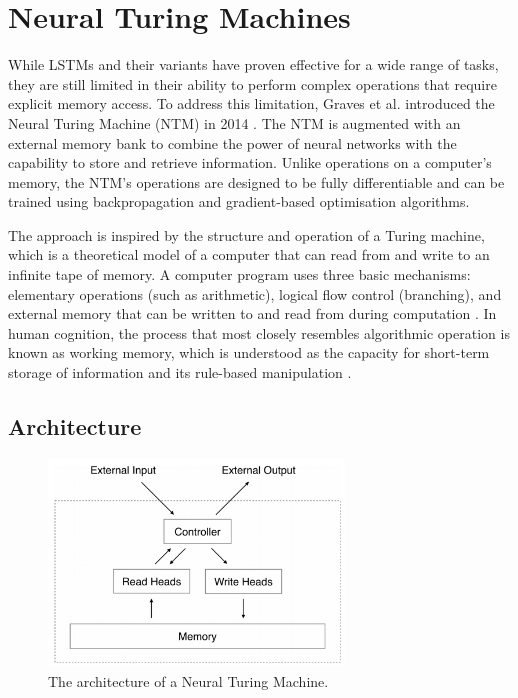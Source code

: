 \documentclass{article}
\begin{document}
\section{Neural Turing Machines}
\label{ch:4}

While LSTMs and their variants have proven effective for a wide range of tasks, they are
still limited in their ability to perform complex operations that require explicit memory
access. To address this limitation, Graves et al. introduced the Neural Turing Machine
(NTM) in 2014 \cite{gravesNeuralTuringMachines2014}. The NTM is augmented with an external
memory bank to combine the power of neural networks with the capability to store and
retrieve information. Unlike operations on a computer's memory, the NTM's operations are
designed to be fully differentiable and can be trained using backpropagation and
gradient-based optimisation algorithms.

The approach is inspired by the structure and operation of a Turing machine, which is a
theoretical model of a computer that can read from and write to an infinite tape of
memory. A computer program uses three basic mechanisms: elementary operations (such as
arithmetic), logical flow control (branching), and external memory that can be written to
and read from during computation \cite{von_neumann_first_1945}. In human cognition, the
process that most closely resembles algorithmic operation is known as working memory,
which is understood as the capacity for short-term storage of information and its
rule-based manipulation \cite{baddeley_memory_2009}.


\subsection{Architecture}
\label{sec:4.0}

\begin{figure}[htbp]
  \centering
  \includegraphics[width=0.7\textwidth]{NTM Structure.png}
  \caption{The architecture of a Neural Turing Machine.}
  \label{fig:ntm-structure}
\end{figure}
\end{document}
